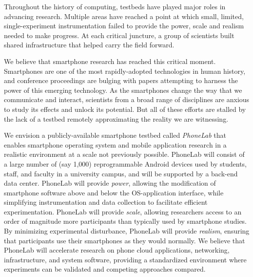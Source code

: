 Throughout the history of computing, testbeds have played major roles in
advancing research. Multiple areas have reached a point at which small,
limited, single-experiment instrumentation failed to provide the power, scale
and realism needed to make progress. At each critical juncture, a group of
scientists built shared infrastructure that helped carry the field forward.

We believe that smartphone research has reached this critical moment. Smartphones are one of the most rapidly-adopted technologies in human history, and conference proceedings are bulging with papers attempting to harness the power of this emerging technology. As the smartphones change the way that we communicate and interact, scientists from a broad range of disciplines are anxious to study its effects and unlock its potential. But all of these efforts are stalled by the lack of a testbed remotely approximating the reality we are witnessing.


We envision a publicly-available smartphone testbed called \emph{PhoneLab} that enables smartphone operating system and mobile application research in a realistic environment at a scale not previously possible. PhoneLab will consist of a large number of (say 1,000) reprogrammable Android devices used by students, staff, and faculty in a university campus, and will be  supported by a back-end data center. PhoneLab will provide \emph{power}, allowing the modification of smartphone software above and below the OS-application interface, while simplifying instrumentation and data collection to facilitate efficient experimentation. PhoneLab will provide \emph{scale}, allowing researchers access to an order of magnitude more participants than typically used by smartphone studies. By minimizing experimental disturbance, PhoneLab will provide \emph{realism}, ensuring that participants use their smartphones as they would normally. We believe that PhoneLab will accelerate research on phone cloud applications, networking, infrastructure, and system software, providing a standardized environment where experiments can be validated and competing approaches compared.

